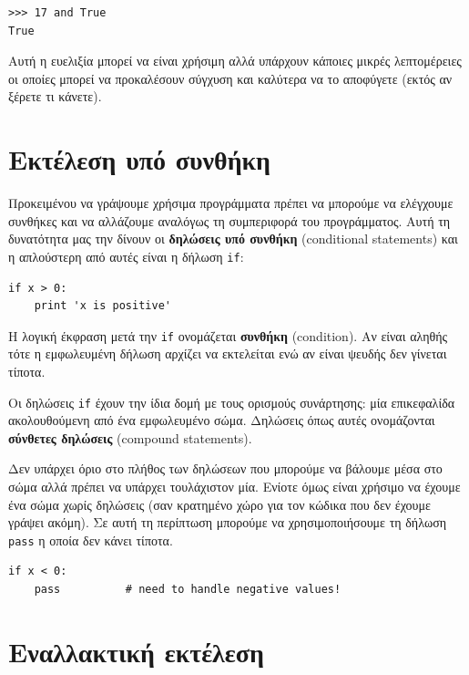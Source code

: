 \documentclass[10pt]{book}
\begin{document}
\begin{verbatim}
>>> 17 and True
True
\end{verbatim}
%

Αυτή η ευελιξία μπορεί να είναι χρήσιμη αλλά υπάρχουν κάποιες μικρές λεπτομέρειες οι οποίες  μπορεί να προκαλέσουν σύγχυση και καλύτερα να το αποφύγετε (εκτός αν ξέρετε τι κάνετε).


\section{Εκτέλεση υπό συνθήκη}
\label{conditional.execution}


Προκειμένου να γράψουμε χρήσιμα προγράμματα πρέπει να μπορούμε
να ελέγχουμε συνθήκες και να αλλάζουμε αναλόγως τη συμπεριφορά του προγράμματος. Αυτή τη δυνατότητα μας την δίνουν οι {\bf δηλώσεις υπό συνθήκη} (conditional statements) και η  απλούστερη από αυτές είναι η δήλωση {\tt if}:

\begin{verbatim}
if x > 0:
    print 'x is positive'
\end{verbatim}
%

Η λογική έκφραση μετά την {\tt if} ονομάζεται {\bf συνθήκη} (condition). Αν είναι αληθής τότε η εμφωλευμένη δήλωση αρχίζει να εκτελείται ενώ αν είναι ψευδής δεν γίνεται τίποτα.

Οι δηλώσεις  {\tt if}  έχουν την ίδια δομή με τους ορισμούς συνάρτησης:
μία επικεφαλίδα ακολουθούμενη από ένα εμφωλευμένο σώμα. Δηλώσεις όπως αυτές
ονομάζονται {\bf σύνθετες δηλώσεις} (compound statements).

Δεν υπάρχει όριο στο πλήθος των δηλώσεων που μπορούμε να βάλουμε μέσα στο σώμα
αλλά πρέπει να υπάρχει τουλάχιστον μία. Ενίοτε όμως είναι χρήσιμο να έχουμε ένα σώμα χωρίς δηλώσεις (σαν κρατημένο χώρο για τον κώδικα που δεν έχουμε γράψει ακόμη). Σε αυτή τη περίπτωση μπορούμε να χρησιμοποιήσουμε τη δήλωση {\tt pass} η οποία δεν κάνει τίποτα.

\begin{verbatim}
if x < 0:
    pass          # need to handle negative values!
\end{verbatim}
%

\section{Εναλλακτική εκτέλεση}
\label{alternative.execution}
\end{document}
